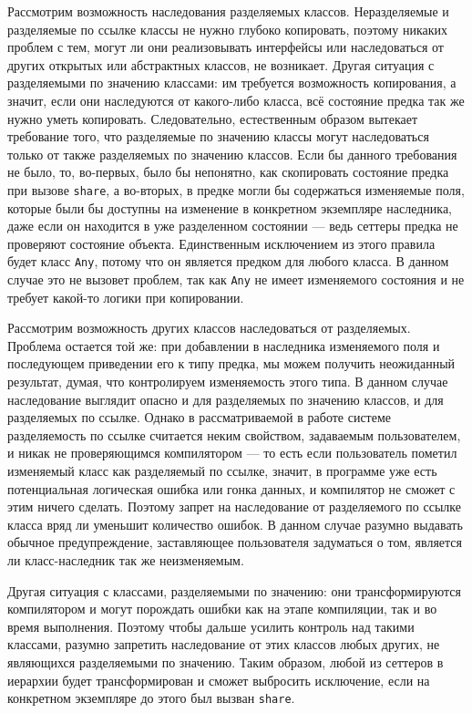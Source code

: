 \documentclass[specification,annotation,times]{itmo-student-thesis}
\begin{document}
Рассмотрим возможность наследования разделяемых классов.
Неразделяемые и разделяемые по ссылке классы не нужно глубоко копировать, поэтому никаких проблем с тем, могут ли они реализовывать интерфейсы или наследоваться от других открытых или абстрактных классов, не возникает.
Другая ситуация с разделяемыми по значению классами: им требуется возможность копирования, а значит, если они наследуются от какого-либо класса, всё состояние предка так же нужно уметь копировать.
Следовательно, естественным образом вытекает требование того, что разделяемые по значению классы могут наследоваться только от также разделяемых по значению классов.
Если бы данного требования не было, то, во-первых, было бы непонятно, как скопировать состояние предка при вызове \texttt{share}, а во-вторых, в предке могли бы содержаться изменяемые поля, которые были бы доступны на изменение в конкретном экземпляре наследника, даже если он находится в уже разделенном состоянии --- ведь сеттеры предка не проверяют состояние объекта.
Единственным исключением из этого правила будет класс \texttt{Any}, потому что он является предком для любого класса.
В данном случае это не вызовет проблем, так как \texttt{Any} не имеет изменяемого состояния и не требует какой-то логики при копировании.

Рассмотрим возможность других классов наследоваться от разделяемых.
Проблема остается той же: при добавлении в наследника изменяемого поля и последующем приведении его к типу предка, мы можем получить неожиданный результат, думая, что контролируем изменяемость этого типа.
 В данном случае наследование выглядит опасно и для разделяемых по значению классов, и для разделяемых по ссылке.
 Однако в рассматриваемой в работе системе разделяемость по ссылке считается неким свойством, задаваемым пользователем, и никак не проверяющимся компилятором --- то есть если пользователь пометил изменяемый класс как разделяемый по ссылке, значит, в программе уже есть потенциальная логическая ошибка или гонка данных, и компилятор не сможет с этим ничего сделать.
 Поэтому запрет на наследование от разделяемого по ссылке класса вряд ли уменьшит количество ошибок. В данном случае разумно выдавать обычное предупреждение, заставляющее пользователя задуматься о том, является ли класс-наследник так же неизменяемым.
 
 Другая ситуация с классами, разделяемыми по значению: они трансформируются компилятором и могут порождать ошибки как на этапе компиляции, так и во время выполнения.
 Поэтому чтобы дальше усилить контроль над такими классами, разумно запретить наследование от этих классов любых других, не являющихся разделяемыми по значению. Таким образом, любой из сеттеров в иерархии будет трансформирован и сможет выбросить исключение, если на конкретном экземпляре до этого был вызван \texttt{share}.
 
\end{document}
